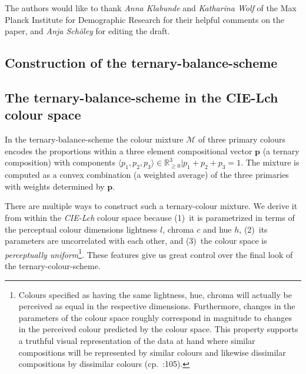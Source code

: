 \documentclass[parskip=half]{scrartcl}
\begin{document}
The authors would like to thank \emph{Anna Klabunde} and \emph{Katharina Wolf} of the Max Planck Institute for Demographic Research for their helpful comments on the paper, and \emph{Anja Schöley} for editing the draft.

\clearpage


\sloppy
\printbibliography

\clearpage


\renewcommand\thefigure{\thesection.\arabic{figure}}
\setcounter{figure}{0}

\begin{appendix}

\section{Construction of the ternary-balance-scheme} %
\label{sec:app-tbs}

\subsection{The ternary-balance-scheme in the CIE-Lch colour space} %
\label{ssec:app-cie}

In the ternary-balance-scheme the colour mixture $\mathscr{M}$ of three primary colours encodes the proportions within a three element compositional vector $\textbf{p}$ (a ternary composition) with components $\langle p_1, p_2, p_3 \rangle \in \mathbb{R}_{\geq 0}^{3} | p_1+p_2+p_3 = 1.$ The mixture is computed as a convex combination (a weighted average) of the three primaries with weights determined by $\textbf{p}$.

There are multiple ways to construct such a ternary-colour mixture. We derive it from within the \emph{CIE-Lch} colour space because
  (1)~it is parametrized in terms of the perceptual colour dimensions lightness $l$, chroma $c$ and hue $h$,
  (2)~its parameters are uncorrelated with each other, and
  (3)~the colour space is \emph{perceptually uniform}\footnote{
  Colours specified as having the same lightness, hue, chroma will actually be perceived as equal in the respective dimensions. Furthermore, changes in the parameters of the colour space roughly correspond in magnitude to changes in the perceived colour predicted by the colour space. This property supports a truthful visual representation of the data at hand where similar compositions will be represented by similar colours and likewise dissimilar compositions by dissimilar colours (cp.~\cite{Ware2013}:105).
}.
These features give us great control over the final look of the ternary-colour-scheme.


\end{appendix}
\end{document}
